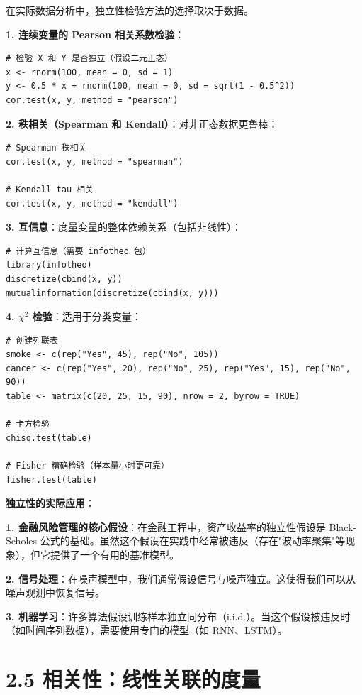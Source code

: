 \begin{example}[独立性检验的更多方法]\label{ex:independence-tests-more-ch2}
在实际数据分析中，独立性检验方法的选择取决于数据。

\textbf{1. 连续变量的 Pearson 相关系数检验}：
\begin{verbatim}
# 检验 X 和 Y 是否独立（假设二元正态）
x <- rnorm(100, mean = 0, sd = 1)
y <- 0.5 * x + rnorm(100, mean = 0, sd = sqrt(1 - 0.5^2))
cor.test(x, y, method = "pearson")
\end{verbatim}

\textbf{2. 秩相关（Spearman 和 Kendall）}：对非正态数据更鲁棒：
\begin{verbatim}
# Spearman 秩相关
cor.test(x, y, method = "spearman")

# Kendall tau 相关
cor.test(x, y, method = "kendall")
\end{verbatim}

\textbf{3. 互信息}：度量变量的整体依赖关系（包括非线性）：
\begin{verbatim}
# 计算互信息（需要 infotheo 包）
library(infotheo)
discretize(cbind(x, y))
mutualinformation(discretize(cbind(x, y)))
\end{verbatim}

\textbf{4. $\chi^2$ 检验}：适用于分类变量：
\begin{verbatim}
# 创建列联表
smoke <- c(rep("Yes", 45), rep("No", 105))
cancer <- c(rep("Yes", 20), rep("No", 25), rep("Yes", 15), rep("No", 90))
table <- matrix(c(20, 25, 15, 90), nrow = 2, byrow = TRUE)

# 卡方检验
chisq.test(table)

# Fisher 精确检验（样本量小时更可靠）
fisher.test(table)
\end{verbatim}
\end{example}

\textbf{独立性的实际应用}：

\textbf{1. 金融风险管理的核心假设}：在金融工程中，资产收益率的独立性假设是 Black-Scholes 公式的基础。虽然这个假设在实践中经常被违反（存在"波动率聚集"等现象），但它提供了一个有用的基准模型。

\textbf{2. 信号处理}：在噪声模型中，我们通常假设信号与噪声独立。这使得我们可以从噪声观测中恢复信号。

\textbf{3. 机器学习}：许多算法假设训练样本独立同分布（i.i.d.）。当这个假设被违反时（如时间序列数据），需要使用专门的模型（如 RNN、LSTM）。
\section{2.5 相关性：线性关联的度量}\label{sec:2.5}

